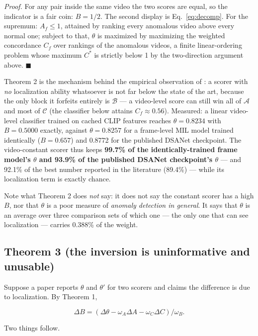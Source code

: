 \documentclass[number,preprint,12pt]{elsarticle}
\begin{document}
\emph{Proof.} For any pair inside the same video the two scores are equal, so the
indicator is a fair coin: \(B = 1/2\). The second display is Eq.~\eqref{eq:decomp}.
For the supremum: \(A_f\le 1\), attained by ranking every anomalous video above
every normal one; subject to that, \(\theta\) is maximized by maximizing the
weighted concordance \(C_f\) over rankings of the anomalous videos, a finite
linear-ordering problem whose maximum \(C^{*}\) is strictly below 1 by the
two-direction argument above. \(\blacksquare\)

Theorem 2 is the mechanism behind the empirical observation of \citet{song2026lookinside}: a
scorer with \emph{no} localization ability whatsoever is not far below the state of
the art, because the only block it forfeits entirely is \(\mathcal{B}\) --- a
video-level score can still win all of \(\mathcal{A}\) and most of \(\mathcal{C}\)
(the classifier below attains \(C_f\approx0.56\)). Measured: a
linear video-level classifier trained on cached CLIP features reaches
\(\theta=0.8234\) with \(B=0.5000\) exactly, against \(\theta=0.8257\) for a frame-level
MIL model trained identically (\(B=0.657\)) and 0.8772 for the published
DSANet checkpoint. The video-constant scorer thus keeps \textbf{99.7\% of the
identically-trained frame model's \(\theta\) and 93.9\% of the published DSANet
checkpoint's \(\theta\)} --- and 92.1\% of the best number reported in the
literature (89.4\%) --- while its localization term is exactly chance.

Note what Theorem 2 does \emph{not} say: it does not say the constant scorer has a
high \(B\), nor that \(\theta\) is a poor measure of \emph{anomaly detection in general}. It
says that \(\theta\) is an average over three comparison sets of which one --- the only
one that can see localization --- carries 0.388\% of the weight.

\subsection{Theorem 3 (the inversion is uninformative and unusable)}\label{sec:thm3}

Suppose a paper reports \(\theta\) and \(\theta'\) for two scorers and claims the difference is
due to localization. By Theorem 1,

\begin{equation}
\Delta B=(\Delta\theta-\omega_A\Delta A-\omega_C\Delta C)/\omega_B.
\end{equation}

Two things follow.
\end{document}
